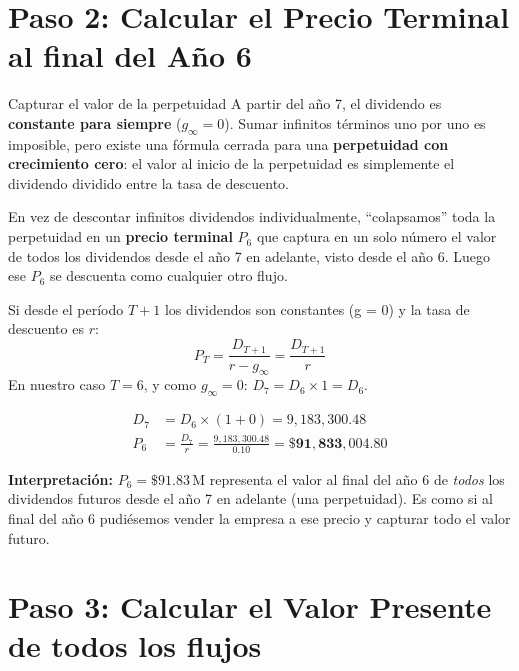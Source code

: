 \documentclass[12pt,a4paper]{article}
\begin{document}
\section{Paso 2: Calcular el Precio Terminal al final del A\~no 6}

\begin{cajaintuicion}{Capturar el valor de la perpetuidad}
A partir del a\~no 7, el dividendo es \textbf{constante para siempre} ($g_\infty = 0$). Sumar
infinitos t\'erminos uno por uno es imposible, pero existe una f\'ormula cerrada para una
\textbf{perpetuidad con crecimiento cero}: el valor al inicio de la perpetuidad es simplemente
el dividendo dividido entre la tasa de descuento.

En vez de descontar infinitos dividendos individualmente, ``colapsamos'' toda la perpetuidad en
un \textbf{precio terminal} $P_6$ que captura en un solo n\'umero el valor de todos los
dividendos desde el a\~no 7 en adelante, visto desde el a\~no 6. Luego ese $P_6$ se descuenta
como cualquier otro flujo.
\end{cajaintuicion}

\begin{cajaformula}
Si desde el per\'iodo $T+1$ los dividendos son constantes (g = 0) y la tasa de descuento es $r$:
\[
P_T = \frac{D_{T+1}}{r - g_\infty} = \frac{D_{T+1}}{r}
\]
En nuestro caso $T = 6$, y como $g_\infty = 0$: $D_7 = D_6 \times 1 = D_6$.
\end{cajaformula}

\begin{align}
D_7 &= D_6 \times (1 + 0) = 9{,}183{,}300.48 \\[8pt]
P_6 &= \frac{D_7}{r} = \frac{9{,}183{,}300.48}{0.10}
     = \mathbf{\$91{,}833{,}004.80}
\end{align}

\noindent\textbf{Interpretaci\'on:} $P_6 = \$91.83\,\text{M}$ representa el valor al final
del a\~no 6 de \emph{todos} los dividendos futuros desde el a\~no 7 en adelante (una
perpetuidad). Es como si al final del a\~no 6 pudi\'esemos vender la empresa a ese precio y
capturar todo el valor futuro.

\vspace{1cm}

\section{Paso 3: Calcular el Valor Presente de todos los flujos}
\end{document}
